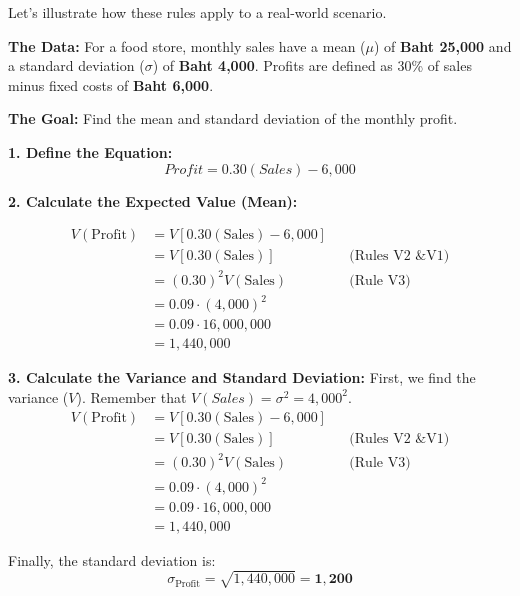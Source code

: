 \documentclass[
  letterpaper,
  DIV=11,
  numbers=noendperiod]{scrreprt}
\begin{document}
\begin{tcolorbox}[enhanced jigsaw, coltitle=black, colbacktitle=quarto-callout-note-color!10!white, left=2mm, bottomrule=.15mm, bottomtitle=1mm, colback=white, titlerule=0mm, colframe=quarto-callout-note-color-frame, breakable, leftrule=.75mm, toptitle=1mm, opacitybacktitle=0.6, rightrule=.15mm, title=\textcolor{quarto-callout-note-color}{\faInfo}\hspace{0.5em}{Example: Monthly Profit Analysis}, arc=.35mm, opacityback=0, toprule=.15mm]

Let's illustrate how these rules apply to a real-world scenario.

\textbf{The Data:} For a food store, monthly sales have a mean (\(\mu\))
of \textbf{Baht 25,000} and a standard deviation (\(\sigma\)) of
\textbf{Baht 4,000}. Profits are defined as 30\% of sales minus fixed
costs of \textbf{Baht 6,000}.

\textbf{The Goal:} Find the mean and standard deviation of the monthly
profit.

\textbf{1. Define the Equation:} \[Profit = 0.30(Sales) - 6,000\]

\textbf{2. Calculate the Expected Value (Mean):}

\[
\begin{aligned}
V(\text{Profit}) &= V[0.30(\text{Sales}) - 6,000] \\
                 &= V[0.30(\text{Sales})]           && \text{(Rules V2 \& V1)} \\
                 &= (0.30)^2 V(\text{Sales})        && \text{(Rule V3)} \\
                 &= 0.09 \cdot (4,000)^2            \\
                 &= 0.09 \cdot 16,000,000           \\
                 &= 1,440,000
\end{aligned}
\]

\textbf{3. Calculate the Variance and Standard Deviation:} First, we
find the variance (\(V\)). Remember that
\(V(Sales) = \sigma^2 = 4,000^2\). \[
\begin{aligned}
V(\text{Profit}) &= V[0.30(\text{Sales}) - 6,000] \\
                 &= V[0.30(\text{Sales})]           && \text{(Rules V2 \& V1)} \\
                 &= (0.30)^2 V(\text{Sales})        && \text{(Rule V3)} \\
                 &= 0.09 \cdot (4,000)^2            \\
                 &= 0.09 \cdot 16,000,000           \\
                 &= 1,440,000
\end{aligned}
\]

Finally, the standard deviation is:
\[\sigma_{\text{Profit}} = \sqrt{1,440,000} = \mathbf{1,200}\]

\end{tcolorbox}
\end{document}
